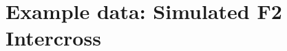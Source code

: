 \documentclass[9pt,twocolumn,twoside]{gsag3jnl}
\begin{document}




\section*{Example data: Simulated F2 Intercross}
\end{document}
